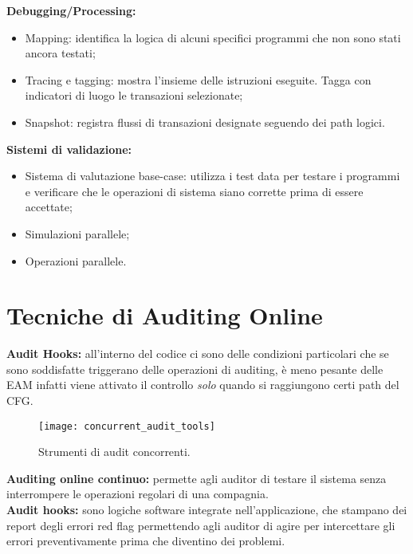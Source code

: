 \textbf{Debugging/Processing:}

\begin{itemize}
    \item Mapping: identifica la logica di alcuni specifici programmi che non
    sono stati ancora testati;
    \item Tracing e tagging: mostra l'insieme delle istruzioni eseguite. Tagga
    con indicatori di luogo le
    transazioni selezionate;
    \item Snapshot: registra flussi di transazioni designate seguendo dei path
    logici.
\end{itemize}

\textbf{Sistemi di validazione:}

\begin{itemize}
    \item Sistema di valutazione base-case: utilizza i test data per testare i
    programmi e verificare che
    le operazioni di sistema siano corrette prima di essere accettate;
    \item Simulazioni parallele;
    \item Operazioni parallele.
\end{itemize}

\section{Tecniche di Auditing Online}

\textbf{Audit Hooks:} all'interno del codice ci sono delle condizioni
particolari che se sono soddisfatte triggerano delle operazioni di auditing, è
meno pesante delle EAM infatti viene attivato il controllo \emph{solo} quando
si raggiungono certi path del CFG.

\begin{figure}[h!]
        \begin{center}
                \texttt{[image: concurrent\_audit\_tools]}
        \end{center}
        \caption{Strumenti di audit concorrenti.}
        \label{fig:concurrent:audit:tools}
\end{figure}

\noindent \textbf{Auditing online continuo:} permette agli auditor di
testare il sistema senza interrompere le operazioni regolari di una
compagnia.\\
\newline
\textbf{Audit hooks:} sono logiche software integrate nell'applicazione, che
stampano dei report degli errori red flag permettendo agli auditor di agire
per intercettare gli errori preventivamente prima che diventino dei problemi.

